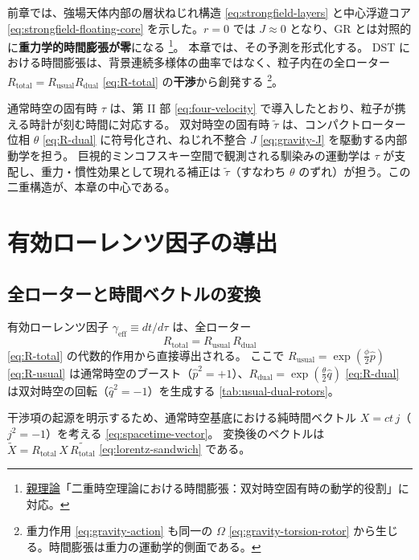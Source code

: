\documentclass[dvipdfmx,a4paper,oneside]{jsbook}
\numberwithin{equation}{chapter}
\begin{document}
前章では、強場天体内部の層状ねじれ構造 \eqref{eq:strongfield-layers} と中心浮遊コア \eqref{eq:strongfield-floating-core} を示した。\(r = 0\) では \(J \approx 0\) となり、GR とは対照的に\textbf{重力学的時間膨張が零}になる \footnote{\hyperref[sec:sister-manuscripts]{親理論}「二重時空理論における時間膨張：双対時空固有時の動学的役割」に対応。}。
本章では、その予測を形式化する。
DST における時間膨張は、背景連続多様体の曲率ではなく、粒子内在の全ローター \(R_{\mathrm{total}} = R_{\mathrm{usual}} R_{\mathrm{dual}}\) \eqref{eq:R-total} の\textbf{干渉}から創発する \footnote{重力作用 \eqref{eq:gravity-action} も同一の \(\Omega\) \eqref{eq:gravity-torsion-rotor} から生じる。時間膨張は重力の運動学的側面である。}。

通常時空の固有時 \(\tau\) は、第 II 部 \eqref{eq:four-velocity} で導入したとおり、粒子が携える時計が刻む時間に対応する。
双対時空の固有時 \(\tilde{\tau}\) は、コンパクトローター位相 \(\theta\) \eqref{eq:R-dual} に符号化され、ねじれ不整合 \(J\) \eqref{eq:gravity-J} を駆動する内部動学を担う。
巨視的ミンコフスキー空間で観測される馴染みの運動学は \(\tau\) が支配し、重力・慣性効果として現れる補正は \(\tilde{\tau}\)（すなわち \(\theta\) のずれ）が担う。この二重構造が、本章の中心である。

\section{有効ローレンツ因子の導出}

\subsection{全ローターと時間ベクトルの変換}

有効ローレンツ因子 \(\gamma_{\mathrm{eff}} \equiv dt/d\tau\) は、全ローター
\begin{equation}
  R_{\mathrm{total}} = R_{\mathrm{usual}}\, R_{\mathrm{dual}}
  \label{eq:timedilation-Rtotal}
\end{equation}
\eqref{eq:R-total} の代数的作用から直接導出される。
ここで \(R_{\mathrm{usual}} = \exp(\tfrac{\phi}{2}\hat{p})\) \eqref{eq:R-usual} は通常時空のブースト（\(\hat{p}^2 = +1\)）、\(R_{\mathrm{dual}} = \exp(\tfrac{\theta}{2}\hat{q})\) \eqref{eq:R-dual} は双対時空の回転（\(\hat{q}^2 = -1\)）を生成する \eqref{tab:usual-dual-rotors}。

干渉項の起源を明示するため、通常時空基底における純時間ベクトル \(X = ct\, j\)（\(j^2 = -1\)）を考える \eqref{eq:spacetime-vector}。
変換後のベクトルは \(\tilde{X} = R_{\mathrm{total}}\, X\, \widetilde{R_{\mathrm{total}}}\) \eqref{eq:lorentz-sandwich} である。
\end{document}

